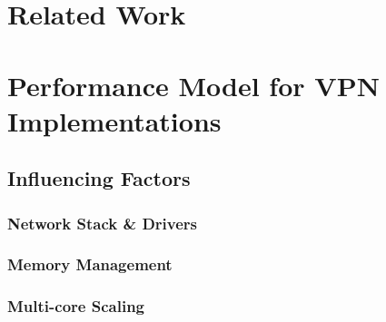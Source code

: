 \documentclass[IN,11pt,twoside,openright,master,english]{tumthesis}
\author{Maximilian~Pudelko}
\date{November 15, 2018}
\begin{document}
%


\maketitle%
\cleardoublepage


\begin{abstract}
	
\end{abstract}

\begin{otherlanguage}{ngerman}
	\begin{abstract}
		
	\end{abstract}
\end{otherlanguage}



\tableofcontents
\listoffigures
\listoftables

\startcontent




\chapter{Related Work}
\label{chap:related_work}


\chapter{Performance Model for VPN Implementations}
\label{chap:perf_model}
\section{Influencing Factors}
	\subsection{Network Stack \& Drivers}
	\subsection{Memory Management}
	\subsection{Multi-core Scaling}
\end{document}
